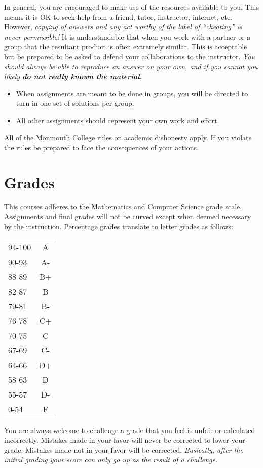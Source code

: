 \documentclass[10pt]{article}
\begin{document}
In general, you are encouraged to make use of the resources available to you.  This means it is OK to seek help from a friend, tutor, instructor, internet, etc.  However, \textit{copying of answers and any act worthy of the label of ``cheating'' is never permissible!}  It is understandable that when you work with a partner or a group that the resultant product is often extremely similar.  This is acceptable but be prepared to be asked to defend your collaborations to the instructor.  \textit{You should always be able to reproduce an answer on your own, and if you cannot you likely \textbf{do not really known the material.}} 
\begin{itemize}
\item When assignments are meant to be done in groups, you will be directed to turn in one set of solutions per group.
\item All other assignments should represent your own work and effort.
\end{itemize}
All of the Monmouth College rules on academic dishonesty apply.  If you violate the rules be prepared to face the consequences of your actions. 


\newpage
\section{Grades}

This courses adheres to the Mathematics and Computer Science grade scale.  Assignments and final grades will not be curved except when deemed necessary by the instruction.  Percentage grades translate to letter grades as follows:
\newline
\begin{small}
\begin{tabular}{lc}
94-100 & A \\
90-93 & A- \\
88-89 & B+ \\
82-87 & B \\
79-81 & B- \\
76-78 & C+ \\
70-75 & C \\
67-69 & C- \\
64-66 & D+ \\
58-63 & D \\
55-57 & D- \\
0-54 & F 
\end{tabular}
\end{small}
\newline
You are always welcome to challenge a grade that you feel is unfair or calculated incorrectly.  Mistakes made in your favor will never be corrected to lower your grade.  Mistakes made not in your favor will be corrected.  \textit{Basically, after the initial grading your score can only go up as the result of a challenge.}
\end{document}
